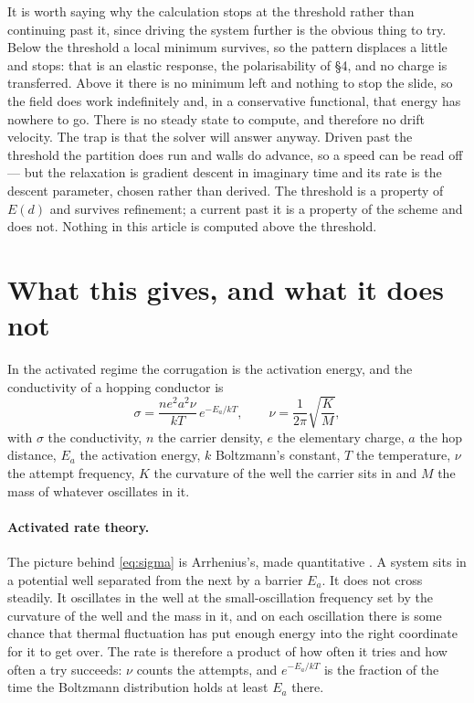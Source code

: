 \documentclass[11pt]{article}
\begin{document}
It is worth saying why the calculation stops at the threshold rather than continuing past it, since
driving the system further is the obvious thing to try. Below the threshold a local minimum
survives, so the pattern displaces a little and stops: that is an elastic response, the
polarisability of \S4, and no charge is transferred. Above it there is no minimum left and nothing
to stop the slide, so the field does work indefinitely and, in a conservative functional, that
energy has nowhere to go. There is no steady state to compute, and therefore no drift velocity.
The trap is that the solver will answer anyway. Driven past the threshold the partition does run and
walls do advance, so a speed can be read off --- but the relaxation is gradient descent in imaginary
time and its rate is the descent parameter, chosen rather than derived. The threshold is a property
of $E(d)$ and survives refinement; a current past it is a property of the scheme and does not.
Nothing in this article is computed above the threshold.

\section{What this gives, and what it does not}

In the activated regime the corrugation is the activation energy, and the conductivity of a hopping
conductor is
\begin{equation}\label{eq:sigma}
\sigma = \frac{n e^2 a^2 \nu}{kT}\,e^{-E_a/kT},
\qquad
\nu = \frac{1}{2\pi}\sqrt{\frac{K}{M}},
\end{equation}
with $\sigma$ the conductivity, $n$ the carrier density, $e$ the elementary charge, $a$ the hop
distance, $E_a$ the activation energy, $k$ Boltzmann's constant, $T$ the temperature, $\nu$ the
attempt frequency, $K$ the curvature of the well the carrier sits in and $M$ the mass of whatever
oscillates in it.

\paragraph{Activated rate theory.} The picture behind \eqref{eq:sigma} is Arrhenius's, made
quantitative \cite{hanggi}. A system sits in a potential well separated from the next by a barrier
$E_a$. It does not cross steadily. It oscillates in the well at the small-oscillation frequency set
by the curvature of the well and the mass in it, and on each oscillation there is some chance that
thermal fluctuation has put enough energy into the right coordinate for it to get over. The rate is
therefore a product of how often it tries and how often a try succeeds: $\nu$ counts the attempts,
and $e^{-E_a/kT}$ is the fraction of the time the Boltzmann distribution holds at least $E_a$ there.
\end{document}
